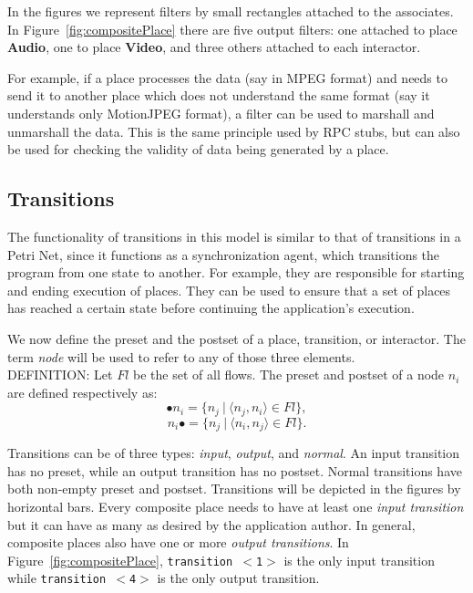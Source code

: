 \documentclass[twocolumn,10pt]{article}
\newcommand{\trans}[1]{{\tt transition $<$#1$>$}}
\newcommand{\elmt}[1]{{\bf #1}}
\newenvironment{definition}{DEFINITION:}{}
\begin{document}
In the figures we represent filters by small rectangles attached to
the associates.  In Figure~\ref{fig:compositePlace} there are five
output filters: one attached to place \elmt{Audio}, one to place
\elmt{Video}, and three others attached to each interactor.

For example, if a place processes the data (say in MPEG format) and
needs to send it to another place which does not understand the same
format (say it understands only MotionJPEG format), a filter can be
used to marshall and unmarshall the data.  This is
the same principle used by RPC stubs, but can also be
used for checking the validity of data being generated by a place.

\subsection{Transitions}

The functionality of transitions in this model is similar to that of
transitions in a Petri Net, since it functions as a synchronization
agent, which transitions the program from one state to another.  For
example, they are responsible for
starting and ending execution of places.  They can be used to ensure
that a set of places has reached a certain state before continuing the
application's execution.


We now define the preset
and the postset of a place, transition, or interactor.  The term {\em
node} will be used to refer to any of those three elements.\\

\begin{definition}
  Let $Fl$ be the set of all flows.  The preset and postset of a node
  $n_i$ are defined respectively as:
  \[\bullet n_i = \{n_j\ |\ \langle n_j,n_i \rangle \in Fl\},\]
  \[n_i \bullet = \{n_j\ |\ \langle n_i,n_j \rangle \in Fl\}.\]
\end{definition}

Transitions can be of three types: {\em input}, {\em output}, and {\em
normal}.  An input transition has no preset, while an output
transition has no postset.  Normal transitions have both non-empty
preset and postset.  Transitions will be depicted in the figures by
horizontal bars.  Every composite place needs to have at least one
{\em input transition} but it can have as many as desired by the
application author.  In general, composite places also have one or
more {\em output transitions}.  In Figure~\ref{fig:compositePlace},
\trans{1} is the only input transition while \trans{4} is the only
output transition.
\end{document}
